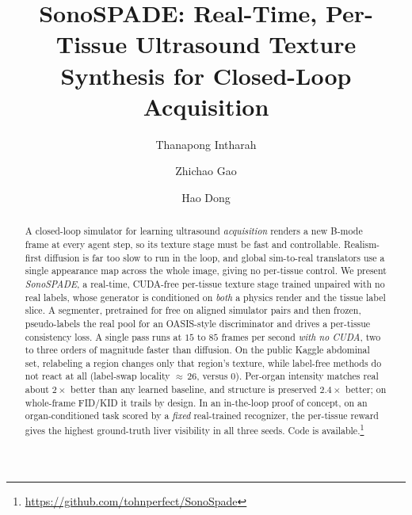 \documentclass[runningheads]{llncs}
\begin{document}
\title{SonoSPADE: Real-Time, Per-Tissue Ultrasound Texture Synthesis for Closed-Loop Acquisition}
\author{Thanapong Intharah \and Zhichao Gao \and Hao Dong}
\maketitle

\begin{abstract}
A closed-loop simulator for learning ultrasound \emph{acquisition} renders a new B-mode frame at every agent step, so its texture stage must be fast and controllable. 
Realism-first diffusion is far too slow to run in the loop, and global sim-to-real translators use a single appearance map across the whole image, giving no per-tissue control. 
We present \emph{SonoSPADE}, a real-time, CUDA-free per-tissue texture stage trained unpaired with no real labels, whose generator is conditioned on \emph{both} a physics render and the tissue label slice. 
A segmenter, pretrained for free on aligned simulator pairs and then frozen, pseudo-labels the real pool for an OASIS-style discriminator and drives a per-tissue consistency loss. 
A single pass runs at $15$ to $85$ frames per second \emph{with no CUDA}, two to three orders of magnitude faster than diffusion. 
On the public Kaggle abdominal set, relabeling a region changes only that region's texture, while label-free methods do not react at all (label-swap locality ${\approx}\,26$, versus $0$). 
Per-organ intensity matches real about $2\times$ better than any learned baseline, and structure is preserved $2.4\times$ better; on whole-frame FID/KID it trails by design. 
In an in-the-loop proof of concept, on an organ-conditioned task scored by a \emph{fixed} real-trained recognizer, the per-tissue reward gives the highest ground-truth liver visibility in all three seeds. Code is available.\footnote{\url{https://github.com/tohnperfect/SonoSpade}}
\end{abstract}
\end{document}
